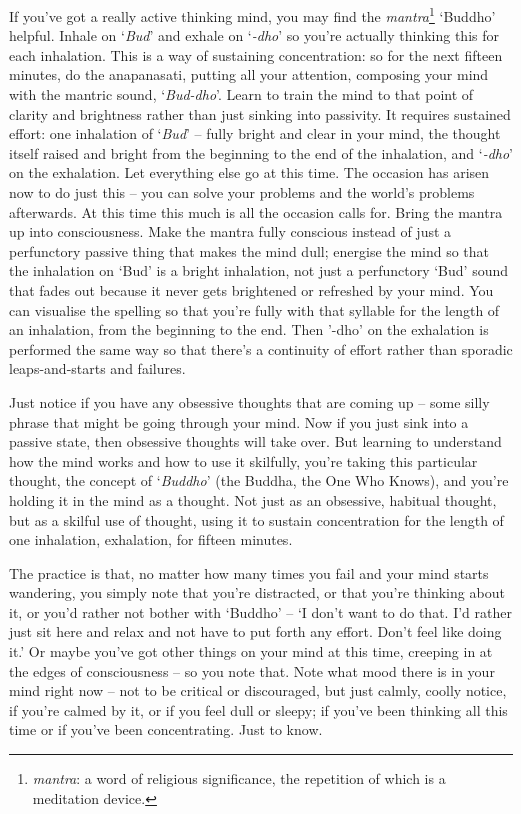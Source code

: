 
If you've got a really active thinking mind, you may find the \textit{mantra}\footnote{\textit{mantra}: a word of religious significance, the repetition of which is a meditation device.} `Buddho' helpful. Inhale on `\textit{Bud}' and exhale on `\textit{-dho}' so you're actually thinking this for each inhalation. This is a way of sustaining concentration: so for the next fifteen minutes, do the anapanasati, putting all your attention, composing your mind with the mantric sound, `\textit{Bud-dho}'. Learn to train the mind to that point of clarity and brightness rather than just sinking into passivity. It requires sustained effort: one inhalation of `\textit{Bud}' -- fully bright and clear in your mind, the thought itself raised and bright from the beginning to the end of the inhalation, and `\textit{-dho}' on the exhalation. Let everything else go at this time. The occasion has arisen now to do just this -- you can solve your problems and the world's problems afterwards. At this time this much is all the occasion calls for. Bring the mantra up into consciousness. Make the mantra fully conscious instead of just a perfunctory passive thing that makes the mind dull; energise the mind so that the inhalation on `Bud' is a bright inhalation, not just a perfunctory `Bud' sound that fades out because it never gets brightened or refreshed by your mind. You can visualise the spelling so that you're fully with that syllable for the length of an inhalation, from the beginning to the end. Then '-dho' on the exhalation is performed the same way so that there's a continuity of effort rather than sporadic leaps-and-starts and failures.

Just notice if you have any obsessive thoughts that are coming up -- some silly phrase that might be going through your mind. Now if you just sink into a passive state, then obsessive thoughts will take over. But learning to understand how the mind works and how to use it skilfully, you're taking this particular thought, the concept of `\textit{Buddho}' (the Buddha, the One Who Knows), and you're holding it in the mind as a thought. Not just as an obsessive, habitual thought, but as a skilful use of thought, using it to sustain concentration for the length of one inhalation, exhalation, for fifteen minutes. 

The practice is that, no matter how many times you fail and your mind starts wandering, you simply note that you're distracted, or that you're thinking about it, or you'd rather not bother with `Buddho' -- `I don't want to do that. I'd rather just sit here and relax and not have to put forth any effort. Don't feel like doing it.' Or maybe you've got other things on your mind at this time, creeping in at the edges of consciousness -- so you note that. Note what mood there is in your mind right now -- not to be critical or discouraged, but just calmly, coolly notice, if you're calmed by it, or if you feel dull or sleepy; if you've been thinking all this time or if you've been concentrating. Just to know.

